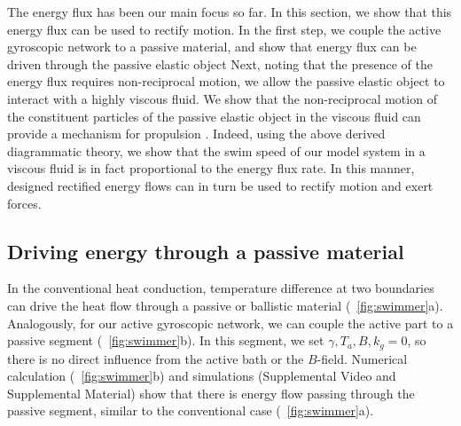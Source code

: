 \documentclass[
 preprint,
 preprintnumbers,
 amsmath,amssymb,
 aps,
 pre,
 longbibliography,
 superscriptaddress,
 10pt, twocolumn
]{revtex4-1}
\begin{document}
The energy flux has been our main focus so far. In this section, we show that this energy flux can be used to rectify motion. 
In the first step, we couple the active gyroscopic network to a passive material, and show that energy flux can be driven through the passive elastic object
Next, noting that the presence of the energy flux requires non-reciprocal motion, we allow the passive elastic object to interact with a highly viscous fluid. We show that the non-reciprocal motion of the constituent particles of the passive elastic object in the viscous fluid can provide a mechanism for propulsion \cite{Golestanian2008AnalyticResults}. Indeed, using the above derived diagrammatic theory, we show that the swim speed of our model system in a viscous fluid is in fact proportional to the energy flux rate. In this manner, designed rectified energy flows can in turn be used to rectify motion and exert forces. 


\subsection{Driving energy through a passive material}
In the conventional heat conduction, temperature difference at two boundaries can drive the heat flow through a passive or ballistic material (\figurename~\ref{fig:swimmer}a).
Analogously, for our active gyroscopic network, we can couple the active part to a passive segment (\figurename~\ref{fig:swimmer}b). In this segment, we set $\gamma,T_a,B,k_g=0$, so there is no direct influence from the active bath or the $B$-field.
Numerical calculation (\figurename~\ref{fig:swimmer}b) and simulations (Supplemental Video and Supplemental Material) show that there is energy flow passing through the passive segment, similar to the conventional case (\figurename~\ref{fig:swimmer}a).
\end{document}
